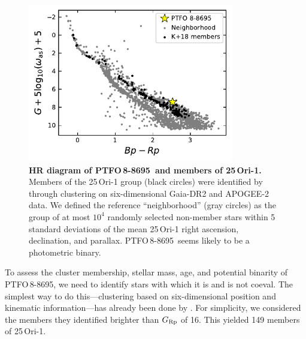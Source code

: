 \documentclass[12pt,twocolumn,tighten]{aastex62}
\newcommand{\ptfo}{PTFO$\,$8-8695}
\begin{document}
\begin{figure}[t]
	\begin{center}
		\leavevmode
		\includegraphics[width=0.8\textwidth]{f6.pdf}
	\end{center}
	\vspace{-0.7cm}
	\caption{ {\bf HR diagram of \ptfo\ and members of 25$\,$Ori-1.}
  Members of the 25$\,$Ori-1 group (black circles) were identified by
  \citet{kounkel_apogee2_2018} through clustering on six-dimensional
  Gaia-DR2 and APOGEE-2 data.  We defined the reference
  ``neighborhood'' (gray circles) as the group of at most $10^4$
  randomly selected non-member stars within 5 standard deviations of
  the mean 25$\,$Ori-1 right ascension, declination, and parallax.
  \ptfo\ seems likely to be a photometric binary.
	\label{fig:gaia}
	}
\end{figure}

To assess the cluster membership, stellar mass, age, and potential
binarity of \ptfo, we need to identify stars with which it is and is
not coeval.  The simplest way to do this---clustering based on
six-dimensional position and kinematic information---has already been
done by \citet{kounkel_apogee2_2018}.  For simplicity, we considered
the members they identified brighter than $G_{\rm Rp}$ of 16.  This
yielded 149 members of 25$\,$Ori-1.
\end{document}
